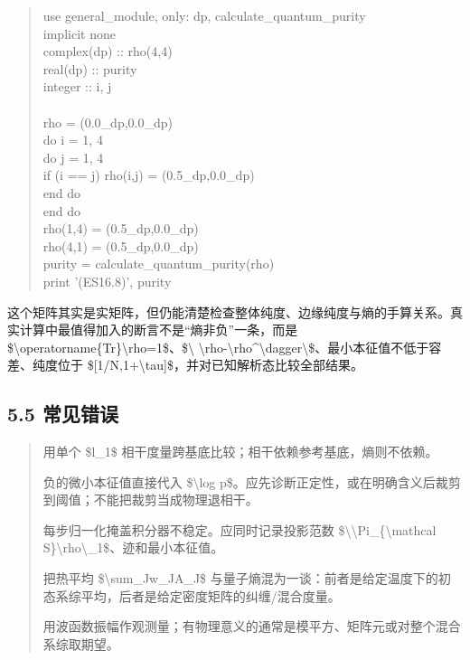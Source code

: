 \documentclass[UTF8,openany,11pt,fontset=fandol]{ctexbook}
\begin{document}
\begin{quote}
use general\_module, only: dp, calculate\_quantum\_purity\\
implicit none\\
complex(dp) :: rho(4,4)\\
real(dp) :: purity\\
integer :: i, j\\
~\\
rho = (0.0\_dp,0.0\_dp)\\
do i = 1, 4\\
do j = 1, 4\\
if (i == j) rho(i,j) = (0.5\_dp,0.0\_dp)\\
end do\\
end do\\
rho(1,4) = (0.5\_dp,0.0\_dp)\\
rho(4,1) = (0.5\_dp,0.0\_dp)\\
purity = calculate\_quantum\_purity(rho)\\
print '(ES16.8)', purity
\end{quote}

这个矩阵其实是实矩阵，但仍能清楚检查整体纯度、边缘纯度与熵的手算关系。真实计算中最值得加入的断言不是``熵非负''一条，而是
\$\textbackslash operatorname\{Tr\}\textbackslash rho=1\$、\$\textbackslash\textbar{}
\textbackslash rho-\textbackslash rho\^{}\textbackslash dagger\textbackslash{}\$、最小本征值不低于容差、纯度位于
\${[}1/N,1+\textbackslash tau{]}\$，并对已知解析态比较全部结果。

\subsection{\texorpdfstring{\textbf{5.5
常见错误}}{5.5 常见错误}}\label{ux5e38ux89c1ux9519ux8bef-4}

\begin{quote}
用单个 \$l\_1\$ 相干度量跨基底比较；相干依赖参考基底，熵则不依赖。

负的微小本征值直接代入 \$\textbackslash log
p\$。应先诊断正定性，或在明确含义后裁剪到阈值；不能把裁剪当成物理退相干。

每步归一化掩盖积分器不稳定。应同时记录投影范数
\$\textbackslash\textbar\textbackslash Pi\_\{\textbackslash mathcal
S\}\textbackslash rho\textbackslash\textbar\_1\$、迹和最小本征值。

把热平均 \$\textbackslash sum\_Jw\_JA\_J\$
与量子熵混为一谈：前者是给定温度下的初态系综平均，后者是给定密度矩阵的纠缠/混合度量。

用波函数振幅作观测量；有物理意义的通常是模平方、矩阵元或对整个混合系综取期望。
\end{quote}
\end{document}
